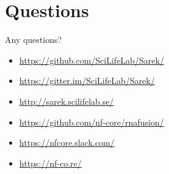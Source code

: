 \documentclass[usepdftitle=false]{beamer}
\begin{document}
{
	\section{Questions}
	\begin{frame}[plain]{Any questions?}
		\begin{itemize}
			\item[\faGithub] \url{https://github.com/SciLifeLab/Sarek/}
			\item[\faGitter] \url{https://gitter.im/SciLifeLab/Sarek/}
			\item[\faGlobe] \url{http://sarek.scilifelab.se/}
		\end{itemize}
		\vspace{3.5cm}
		\begin{itemize}
			\item[\faGithub] \url{https://github.com/nf-core/rnafusion/}
			\item[\faSlack] \url{https://nfcore.slack.com/}
			\item[\faGlobe] \url{https://nf-co.re/}
		\end{itemize}
	\end{frame}
}
\end{document}
